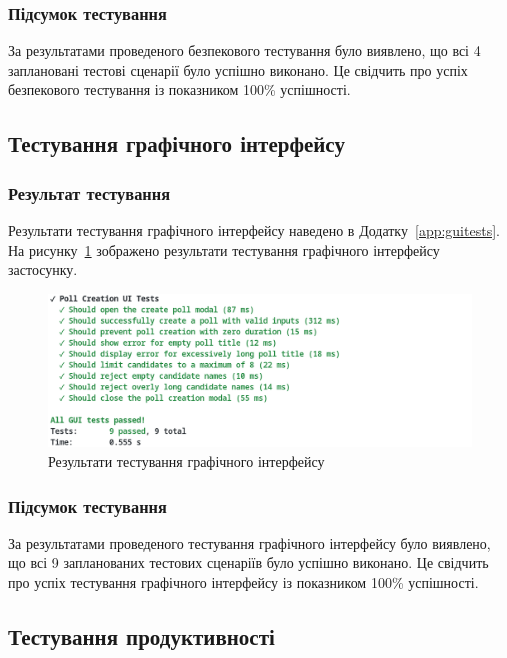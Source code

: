 \documentclass[14pt]{extreport}
\begin{document}
  \subsubsection*{Підсумок тестування}
  
    За результатами проведеного безпекового тестування було виявлено, що всі 4 заплановані тестові сценарії було успішно виконано. Це свідчить про успіх безпекового тестування із показником 100\% успішності.
  
  \subsection{Тестування графічного інтерфейсу}
  
  \subsubsection*{Результат тестування}
  
  Результати тестування графічного інтерфейсу наведено в Додатку~\ref{app:guitests}. На рисунку~\ref{fig:guitests} зображено результати тестування графічного інтерфейсу застосунку.

  \begin{figure}[H]
    \centering
    \includegraphics[scale=0.4]{GuiTests}
    \caption{Результати тестування графічного інтерфейсу}
    \label{fig:guitests}
  \end{figure}
  
  \subsubsection*{Підсумок тестування}
  
  За результатами проведеного тестування графічного інтерфейсу було виявлено, що всі 9 запланованих тестових сценаріїв було успішно виконано. Це свідчить про успіх тестування графічного інтерфейсу із показником 100\% успішності.
  
  \subsection{Тестування продуктивності}
  
\end{document}
